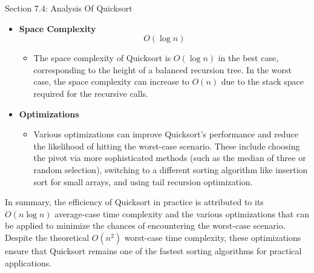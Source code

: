 \begin{notes}{Section 7.4: Analysis Of Quicksort}
\begin{itemize}
        \item \textbf{Space Complexity}
        \begin{equation*}
            O(\log n)
        \end{equation*}
        \begin{itemize}
            \item The space complexity of Quicksort is $O(\log n)$ in the best case, corresponding to the height of a balanced recursion tree. In the worst case, the space complexity can increase to 
            $O(n)$ due to the stack space required for the recursive calls.
        \end{itemize}
        
        \item \textbf{Optimizations}
        \begin{itemize}
            \item Various optimizations can improve Quicksort's performance and reduce the likelihood of hitting the worst-case scenario. These include choosing the pivot via more sophisticated methods 
            (such as the median of three or random selection), switching to a different sorting algorithm like insertion sort for small arrays, and using tail recursion optimization.
        \end{itemize}
    \end{itemize}
    
    In summary, the efficiency of Quicksort in practice is attributed to its $O(n \log n)$ average-case time complexity and the various optimizations that can be applied to minimize the chances of 
    encountering the worst-case scenario. Despite the theoretical $O(n^2)$ worst-case time complexity, these optimizations ensure that Quicksort remains one of the fastest sorting algorithms for practical 
    applications.    
\end{notes}